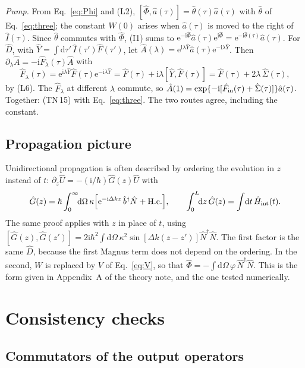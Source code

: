 \documentclass[aps,pra,onecolumn,notitlepage,11pt,amsmath,amssymb,nofootinbib]{revtex4-2}
\newcommand{\Nop}{\hat N}
\newcommand{\Iop}{\hat I}
\newcommand{\dd}{\mathrm{d}}
\newcommand{\ee}{\mathrm{e}}
\newcommand{\ii}{\mathrm{i}}
\begin{document}
\emph{Pump.} From Eq.~\eqref{eq:Phi} and (L2),
$[\hat\Phi,\hat a(\tau)]=\hat\theta(\tau)\hat a(\tau)$ with $\hat\theta$ of
Eq.~\eqref{eq:three}; the constant $W(0)$ arises when $\hat a(\tau)$ is moved
to the right of $\Iop(\tau)$. Since $\hat\theta$ commutes with $\hat\Phi$, (I1)
sums to
$\ee^{-\ii\hat\Phi}\hat a(\tau)\ee^{\ii\hat\Phi}=\ee^{-\ii\hat\theta(\tau)}\hat a(\tau)$.
For $\hat D$, with $\hat Y=\int\dd\tau'\,\Iop(\tau')\hat F(\tau')$, let
$\hat A(\lambda)=\ee^{\ii\lambda\hat Y}\hat a(\tau)\ee^{-\ii\lambda\hat Y}$.
Then $\partial_\lambda\hat A=-\ii\hat F_\lambda(\tau)\hat A$ with
\begin{equation}
\hat F_\lambda(\tau)=\ee^{\ii\lambda\hat Y}\hat F(\tau)\ee^{-\ii\lambda\hat Y}
=\hat F(\tau)+\ii\lambda[\hat Y,\hat F(\tau)]=\hat F(\tau)+2\lambda\,\hat\Sigma(\tau),
\end{equation}
by (L6). The $\hat F_\lambda$ at different $\lambda$ commute, so
$\hat A(1)=\exp\{-\ii[\hat F_{\rm in}(\tau)+\hat\Sigma(\tau)]\}\hat a(\tau)$.
Together: (TN\,15) with Eq.~\eqref{eq:three}. The two routes agree, including
the constant.

\subsection{Propagation picture}
\label{sec:prop}

Unidirectional propagation is often described by ordering the evolution in
$z$ instead of $t$: $\partial_z\hat U=-(\ii/\hbar)\hat G(z)\hat U$ with
\begin{equation}
\hat G(z)=\hbar\int_0^\infty\!\!\dd\Omega\,\kappa
\Big[\ee^{-\ii\Delta kz}\,\hat b^\dagger\Nop+\mathrm{H.c.}\Big],\qquad
\int_0^L\!\!\dd z\,\hat G(z)=\int\!\dd t\,\hat H_{\rm int}(t).
\end{equation}
The same proof applies with $z$ in place of $t$, using
$[\hat G(z),\hat G(z')]=2\ii\hbar^2\int\dd\Omega\,\kappa^2\sin[\Delta k(z-z')]\Nop^\dagger\Nop$.
The first factor is the same $\hat D$, because the first Magnus term does not
depend on the ordering. In the second, $W$ is replaced by $V$ of
Eq.~\eqref{eq:V}, so that
$\hat\Phi=-\int\dd\Omega\,\varphi\,\Nop^\dagger\Nop$. This is the form given
in Appendix~A of the theory note, and the one tested numerically.

\section{Consistency checks}
\label{sec:checks}

\subsection{Commutators of the output operators}
\end{document}
